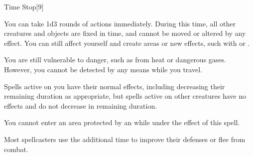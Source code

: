 \begin{spellsection}{Time Stop}[9]
    \begin{spellheader}
    \end{spellheader}
    \begin{spellcontent}
        \begin{spelltargetinginfo}
        \end{spelltargetinginfo}
        \begin{spelleffects}
            \spelleffect You can take 1d3 rounds of actions immediately. During this time, all other creatures and objects are fixed in time, and cannot be moved or altered by any effect. You can still affect yourself and create areas or new effects, such with  or .

            You are still vulnerable to danger, such as from heat or dangerous gases. However, you cannot be detected by any means while you travel.
        \end{spelleffects}
    \end{spellcontent}
    \begin{spellfooter}
        \spellnotes Spells active on you have their normal effects, including decreasing their remaining duration as appropriate, but spells active on other creatures have no effects and do not decrease in remaining duration.

        You cannot enter an area protected by an  while under the effect of this spell.

        Most spellcasters use the additional time to improve their defenses or flee from combat. 
        \miscastexplode
    \end{spellfooter}
\end{spellsection}

